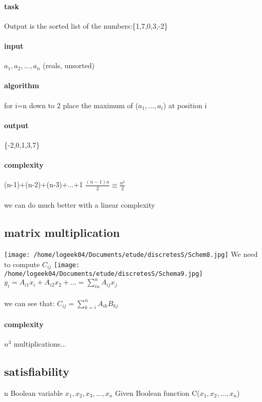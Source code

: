 \documentclass[a4paper,10pt]{article}
\begin{document}
{\paragraph{task}
Output is the sorted list of the numbers:\{1,7,0,3,-2\}
\paragraph{input}
$a_1,a_2,...,a_n$ (reals, unsorted)
\paragraph{algorithm}
for i=n down to 2
\newline
place the maximum of ($a_1,...,a_i$) at position i
\paragraph{output}
\{-2,0,1,3,7\}
\paragraph{complexity}
(n-1)+(n-2)+(n-3)+...+1
\newline
$\frac{(n-1)n}{2}\equiv \frac{n^2}{2}$
\paragraph{}
we can do much better with a linear complexity
\subsection{matrix multiplication}
\texttt{[image: /home/logeek04/Documents/etude/discretesS/Schem8.jpg]}
We need to compute $C_{ij}$
\texttt{[image: /home/logeek04/Documents/etude/discretesS/Schema9.jpg]}
$y_i=A_{i1}x_i+A_{i2}x_2+...=\sum_{in}^{n}A_{ij}x_j$
\paragraph{}
we can see that:
\newline
$C_{ij}=\sum_{k=i}^{n}A_{ik}B_{kj}$
\paragraph{complexity}
$n^3$ multiplications...
\subsection{satisfiability}
n Boolean variable $x_1,x_2,x_3,...,x_n$
\newline
Given Boolean function C($x_1,x_2,...,x_n$)
}
\end{document}
